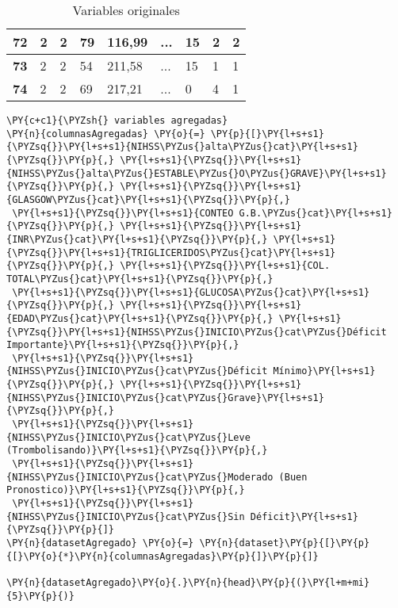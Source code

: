 \begin{table}[H]
{\begin{tabular}{|c|l|l|l|l|l|l|l|l|}
\textbf{72} & 2 & 2 & 79 & 116,99 & ... & 15 & 2 & 2 \\ \hline
\textbf{73} & 2 & 2 & 54 & 211,58 & ... & 15 & 1 & 1 \\ \hline
\textbf{74} & 2 & 2 & 69 & 217,21 & ... & 0 & 4 & 1 \\ \hline
\end{tabular}%
}
\caption{Variables originales}
\label{tab:Variables originales}
\end{table}
        
    \begin{tcolorbox}[breakable, size=fbox, boxrule=1pt, pad at break*=1mm,colback=cellbackground, colframe=cellborder]
\begin{Verbatim}[commandchars=\\\{\}]
\PY{c+c1}{\PYZsh{} variables agregadas}
\PY{n}{columnasAgregadas} \PY{o}{=} \PY{p}{[}\PY{l+s+s1}{\PYZsq{}}\PY{l+s+s1}{NIHSS\PYZus{}alta\PYZus{}cat}\PY{l+s+s1}{\PYZsq{}}\PY{p}{,} \PY{l+s+s1}{\PYZsq{}}\PY{l+s+s1}{NIHSS\PYZus{}alta\PYZus{}ESTABLE\PYZus{}O\PYZus{}GRAVE}\PY{l+s+s1}{\PYZsq{}}\PY{p}{,} \PY{l+s+s1}{\PYZsq{}}\PY{l+s+s1}{GLASGOW\PYZus{}cat}\PY{l+s+s1}{\PYZsq{}}\PY{p}{,}
 \PY{l+s+s1}{\PYZsq{}}\PY{l+s+s1}{CONTEO G.B.\PYZus{}cat}\PY{l+s+s1}{\PYZsq{}}\PY{p}{,} \PY{l+s+s1}{\PYZsq{}}\PY{l+s+s1}{INR\PYZus{}cat}\PY{l+s+s1}{\PYZsq{}}\PY{p}{,} \PY{l+s+s1}{\PYZsq{}}\PY{l+s+s1}{TRIGLICERIDOS\PYZus{}cat}\PY{l+s+s1}{\PYZsq{}}\PY{p}{,} \PY{l+s+s1}{\PYZsq{}}\PY{l+s+s1}{COL. TOTAL\PYZus{}cat}\PY{l+s+s1}{\PYZsq{}}\PY{p}{,}
 \PY{l+s+s1}{\PYZsq{}}\PY{l+s+s1}{GLUCOSA\PYZus{}cat}\PY{l+s+s1}{\PYZsq{}}\PY{p}{,} \PY{l+s+s1}{\PYZsq{}}\PY{l+s+s1}{EDAD\PYZus{}cat}\PY{l+s+s1}{\PYZsq{}}\PY{p}{,} \PY{l+s+s1}{\PYZsq{}}\PY{l+s+s1}{NIHSS\PYZus{}INICIO\PYZus{}cat\PYZus{}Déficit Importante}\PY{l+s+s1}{\PYZsq{}}\PY{p}{,}
 \PY{l+s+s1}{\PYZsq{}}\PY{l+s+s1}{NIHSS\PYZus{}INICIO\PYZus{}cat\PYZus{}Déficit Mínimo}\PY{l+s+s1}{\PYZsq{}}\PY{p}{,} \PY{l+s+s1}{\PYZsq{}}\PY{l+s+s1}{NIHSS\PYZus{}INICIO\PYZus{}cat\PYZus{}Grave}\PY{l+s+s1}{\PYZsq{}}\PY{p}{,}
 \PY{l+s+s1}{\PYZsq{}}\PY{l+s+s1}{NIHSS\PYZus{}INICIO\PYZus{}cat\PYZus{}Leve (Trombolisando)}\PY{l+s+s1}{\PYZsq{}}\PY{p}{,}
 \PY{l+s+s1}{\PYZsq{}}\PY{l+s+s1}{NIHSS\PYZus{}INICIO\PYZus{}cat\PYZus{}Moderado (Buen Pronostico)}\PY{l+s+s1}{\PYZsq{}}\PY{p}{,}
 \PY{l+s+s1}{\PYZsq{}}\PY{l+s+s1}{NIHSS\PYZus{}INICIO\PYZus{}cat\PYZus{}Sin Déficit}\PY{l+s+s1}{\PYZsq{}}\PY{p}{]}
\PY{n}{datasetAgregado} \PY{o}{=} \PY{n}{dataset}\PY{p}{[}\PY{p}{[}\PY{o}{*}\PY{n}{columnasAgregadas}\PY{p}{]}\PY{p}{]}

\PY{n}{datasetAgregado}\PY{o}{.}\PY{n}{head}\PY{p}{(}\PY{l+m+mi}{5}\PY{p}{)}
\end{Verbatim}
\end{tcolorbox}


